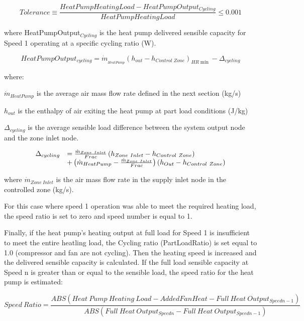 \begin{equation}
  Tolerance \equiv \frac{HeatPumpHeatingLoad - HeatPumpOutput_{Cycling}}{HeatPumpHeatingLoad} \leq 0.001
\end{equation}

where HeatPumpOutput\(_{Cycling}\) is the heat pump delivered sensible capacity for Speed 1 operating at a specific cycling ratio (W).

\begin{equation}
HeatPumpOutpu{t_{cycling}} = {\dot m_{_{HeatPump}}}{\left( {{h_{out}} - {h_{Control\;Zone}}} \right)_{HR\min }} - {\Delta_{cycling}}
\end{equation}

where:

\({\dot m_{HeatPump}}\) is the average air mass flow rate defined in the next section (kg/s)

\(h_{out}\) is the enthalpy of air exiting the heat pump at part load conditions (J/kg)

\(\Delta_{cycling}\) is the average sensible load difference between the system output node and the zone inlet node.

\begin{equation}
  \begin{array}{rl}
    \Delta_{cycling} &= \frac{\dot{m}_{Zone~Inlet}}{Frac} \PB{h_{Zone~Inlet} - h_{Control~Zone}} \\
                           &+ \PB{\dot{m}_{HeatPump} - \frac{\dot{m}_{Zone~Inlet}}{Frac}} \PB{h_{Out} - h_{Control~Zone}}
  \end{array}
\end{equation}

where \({{{\dot m}_{Zone~Inlet}}}\) is the air mass flow rate in the supply inlet node in the controlled zone (kg/s).

For this case where speed 1 operation was able to meet the required heating load, the speed ratio is set to zero and speed number is equal to 1.

Finally, if the heat pump's heating output at full load for Speed 1 is insufficient to meet the entire heatling load, the Cycling ratio (PartLoadRatio) is set equal to 1.0 (compressor and fan are not cycling). Then the heating speed is increased and the delivered sensible capacity is calculated. If the full load sensible capacity at Speed n is greater than or equal to the sensible load, the speed ratio for the heat pump is estimated:

\begin{equation}
Speed~Ratio = \frac{{ABS(Heat~Pump~Heating~Load - AddedFanHeat - Full~Heat~Outpu{t_{Speedn-1}})}}{{ABS(Full~Heat~Outpu{t_{Speedn}} - Full~Heat~Outpu{t_{Speedn-1}})}}
\end{equation}

